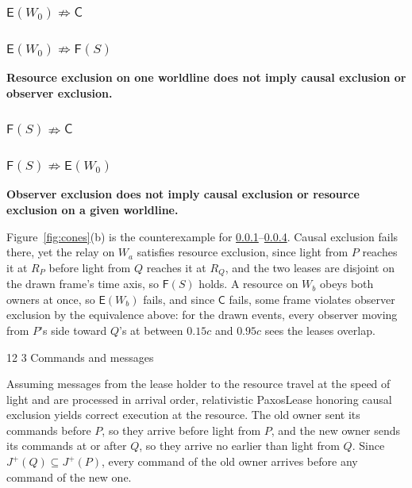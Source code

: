 \documentclass[final,5p,times,twocolumn,number]{elsarticle}
\makeatletter
\newcommand{\figref}[1]{Figure~\ref*{#1}}
\renewcommand\subsection{\@startsection{subsection}{2}{\z@}%
           {12\p@ \@plus 6\p@ \@minus 3\p@}%
           {3\p@ \@plus 6\p@ \@minus 3\p@}%
           {\normalfont\normalsize\bfseries}}
\makeatother
\begin{document}
\subsubsection{$\mathsf{E}(W_0) \nRightarrow \mathsf{C}$}\label{sec:nimp1}
\subsubsection{$\mathsf{E}(W_0) \nRightarrow \mathsf{F}(S)$}
\textbf{Resource exclusion on one worldline does not imply causal exclusion or observer exclusion.}

\subsubsection{$\mathsf{F}(S) \nRightarrow \mathsf{C}$}
\subsubsection{$\mathsf{F}(S) \nRightarrow \mathsf{E}(W_0)$}\label{sec:nimp4}
\textbf{Observer exclusion does not imply causal exclusion or resource exclusion on a given worldline.}

\figref{fig:cones}(b) is the counterexample for \ref*{sec:nimp1}--\ref*{sec:nimp4}.  Causal exclusion fails there, yet the relay on $W_a$ satisfies resource exclusion, since light from $P$ reaches it at $R_P$ before light from $Q$ reaches it at $R_Q$, and the two leases are disjoint on the drawn frame's time axis, so $\mathsf{F}(S)$ holds.  A resource on $W_b$ obeys both owners at once, so $\mathsf{E}(W_b)$ fails, and since $\mathsf{C}$ fails, some frame violates observer exclusion by the equivalence above: for the drawn events, every observer moving from $P$'s side toward $Q$'s at between $0.15c$ and $0.95c$ sees the leases overlap.

\subsection{Commands and messages}

Assuming messages from the lease holder to the resource travel at the speed of light and are processed in arrival order, relativistic PaxosLease honoring causal exclusion yields correct execution at the resource.  The old owner sent its commands before $P$, so they arrive before light from $P$, and the new owner sends its commands at or after $Q$, so they arrive no earlier than light from $Q$.  Since $J^+(Q) \subseteq J^+(P)$, every command of the old owner arrives before any command of the new one.
\end{document}
